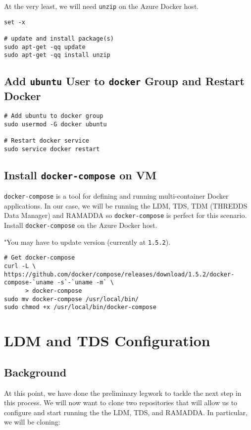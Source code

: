 \documentclass[11pt]{article}
\begin{document}
At the very least, we will need \texttt{unzip} on the Azure Docker host.

\begin{verbatim}
set -x 

# update and install package(s)
sudo apt-get -qq update
sudo apt-get -qq install unzip
\end{verbatim}

\subsection{Add \texttt{ubuntu} User to \texttt{docker} Group and Restart Docker}
\label{sec:orgheadline9}

\begin{verbatim}
# Add ubuntu to docker group
sudo usermod -G docker ubuntu

# Restart docker service
sudo service docker restart
\end{verbatim}

\subsection{Install \texttt{docker-compose} on VM}
\label{sec:orgheadline10}

\texttt{docker-compose} is a tool for defining and running multi-container Docker applications. In our case, we will be running the LDM, TDS, TDM (THREDDS Data Manager) and RAMADDA so \texttt{docker-compose} is perfect for this scenario. Install \texttt{docker-compose} on the Azure Docker host.

"You may have to update version (currently at \texttt{1.5.2}).

\begin{verbatim}
# Get docker-compose
curl -L \
https://github.com/docker/compose/releases/download/1.5.2/docker-compose-`uname -s`-`uname -m` \
      > docker-compose
sudo mv docker-compose /usr/local/bin/
sudo chmod +x /usr/local/bin/docker-compose
\end{verbatim}

\section{LDM and TDS Configuration}
\label{sec:orgheadline27}
\subsection{Background}
\label{sec:orgheadline14}

At this point, we have done the preliminary legwork to tackle the next step in this process. We will now want to clone two repositories that will allow us to configure and start running the the LDM, TDS, and RAMADDA. In particular, we will be cloning:
\end{document}
